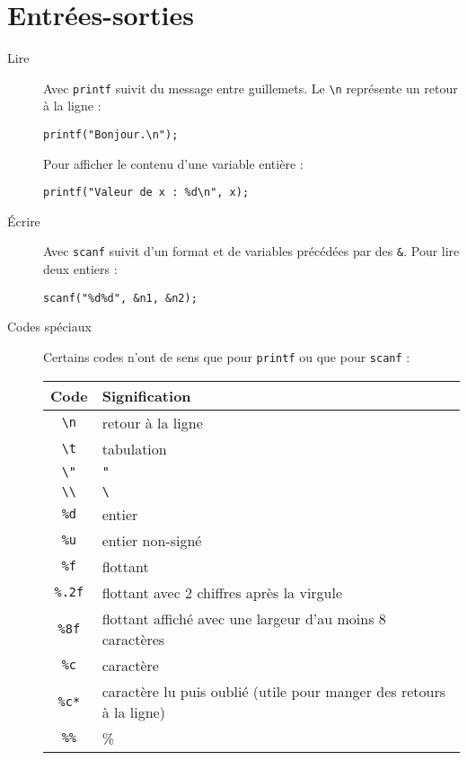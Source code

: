 \documentclass[a4paper,10pt]{article}
\begin{document}
  \section{Entrées-sorties}
  \begin{description}
    \item[Lire] Avec \texttt{printf} suivit du message entre guillemets. Le \texttt{\textbackslash n} représente un retour à la ligne :
      \begin{verbatim}
printf("Bonjour.\n");
      \end{verbatim}
      Pour afficher le contenu d'une variable entière :
      \begin{verbatim}
printf("Valeur de x : %d\n", x);
      \end{verbatim}
    \item[Écrire] Avec \texttt{scanf} suivit d'un format et de variables précédées par des \texttt{\&}. Pour lire deux entiers :
      \begin{verbatim}
scanf("%d%d", &n1, &n2);
      \end{verbatim}
    \item[Codes spéciaux] Certains codes n'ont de sens que pour \texttt{printf} ou que pour \texttt{scanf} :\\
      \begin{tabu}{c|l}
        Code & Signification\\
        \hline
        \texttt{\textbackslash n} & retour à la ligne\\
        \texttt{\textbackslash t} & tabulation\\
        \texttt{\textbackslash "} & \texttt{"}\\
        \texttt{\textbackslash \textbackslash} & \texttt{\textbackslash}\\
        \hline
        \texttt{\%d} & entier\\
        \texttt{\%u} & entier non-signé\\
        \texttt{\%f} & flottant\\
        \texttt{\%.2f} & flottant avec 2 chiffres après la virgule\\
        \texttt{\%8f} & flottant affiché avec une largeur d'au moins 8 caractères\\
        \texttt{\%c} & caractère\\
        \texttt{\%c*} & caractère lu puis oublié (utile pour manger des retours à la ligne)\\
        \texttt{\%\%} & \%\\
      \end{tabu}
  \end{description}
\end{document}

